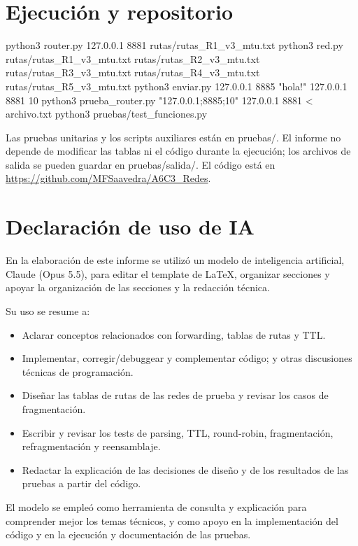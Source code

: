 \documentclass[
	spanish, %
	letterpaper, oneside
]{article}
\newcommand{\codeunderscore}{\textunderscore\allowbreak}
\newcommand{\code}[1]{{\let\_\codeunderscore#1}}     %
\begin{document}
\section{Ejecución y repositorio}
\begin{salida}
python3 router.py 127.0.0.1 8881 rutas/rutas_R1_v3_mtu.txt
python3 red.py rutas/rutas_R1_v3_mtu.txt rutas/rutas_R2_v3_mtu.txt rutas/rutas_R3_v3_mtu.txt rutas/rutas_R4_v3_mtu.txt rutas/rutas_R5_v3_mtu.txt
python3 enviar.py 127.0.0.1 8885 "hola!" 127.0.0.1 8881 10
python3 prueba_router.py "127.0.0.1;8885;10" 127.0.0.1 8881 < archivo.txt
python3 pruebas/test_funciones.py
\end{salida}
Las pruebas unitarias y los scripts auxiliares están en \code{pruebas/}. El informe no depende de modificar las tablas ni el código durante la ejecución; los archivos de salida se pueden guardar en \code{pruebas/salida/}. El código está en \url{https://github.com/MFSaavedra/A6C3_Redes}.
\section{Declaración de uso de IA}
En la elaboración de este informe se utilizó un modelo de inteligencia artificial, Claude (Opus 5.5), para editar el template de LaTeX, organizar secciones y apoyar la organización de las secciones y la redacción técnica.

Su uso se resume a:
\begin{itemize}
	\item Aclarar conceptos relacionados con forwarding, tablas de rutas y TTL.
	\item Implementar, corregir/debuggear y complementar código; y otras discusiones técnicas de programación.
	\item Diseñar las tablas de rutas de las redes de prueba y revisar los casos de fragmentación.
	\item Escribir y revisar los tests de parsing, TTL, round-robin, fragmentación, refragmentación y reensamblaje.
	\item Redactar la explicación de las decisiones de diseño y de los resultados de las pruebas a partir del código.
\end{itemize}

El modelo se empleó como herramienta de consulta y explicación para comprender mejor los temas técnicos, y como apoyo en la implementación del código y en la ejecución y documentación de las pruebas.

\end{document}
